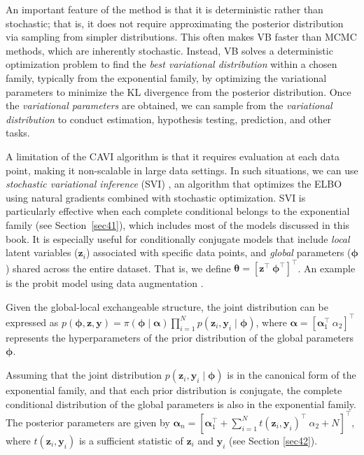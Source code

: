 An important feature of the method is that it is deterministic rather than stochastic; that is, it does not require approximating the posterior distribution via sampling from simpler distributions. This often makes VB faster than MCMC methods, which are inherently stochastic. Instead, VB solves a deterministic optimization problem to find the \textit{best variational distribution} within a chosen family, typically from the exponential family, by optimizing the variational parameters to minimize the KL divergence from the posterior distribution. Once the \textit{variational parameters} are obtained, we can sample from the \textit{variational distribution} to conduct estimation, hypothesis testing, prediction, and other tasks.

A limitation of the CAVI algorithm is that it requires evaluation at each data point, making it non-scalable in large data settings. In such situations, we can use \textit{stochastic variational inference} (SVI) \cite{hoffman2013stochastic}, an algorithm that optimizes the ELBO using natural gradients combined with stochastic optimization. SVI is particularly effective when each complete conditional belongs to the exponential family (see Section~\ref{sec41}), which includes most of the models discussed in this book. It is especially useful for conditionally conjugate models that include \textit{local} latent variables ($\boldsymbol{z}_i$) associated with specific data points, and \textit{global} parameters ($\boldsymbol{\phi}$) shared across the entire dataset. That is, we define $\boldsymbol\theta = [\boldsymbol{z}^{\top} \ \boldsymbol{\phi}^{\top}]^{\top}$. An example is the probit model using data augmentation \cite{Tanner1987}.

Given the global-local exchangeable structure, the joint distribution can be expressed as $p(\boldsymbol{\phi}, \boldsymbol{z}, \boldsymbol{y}) = \pi(\boldsymbol{\phi} \mid \boldsymbol{\alpha}) \prod_{i=1}^{N} p(\boldsymbol{z}_i, \boldsymbol{y}_i \mid \boldsymbol{\phi})$, where $\boldsymbol{\alpha} = [\boldsymbol{\alpha}_1^{\top} \ \alpha_2]^{\top}$ represents the hyperparameters of the prior distribution of the global parameters $\boldsymbol{\phi}$.

Assuming that the joint distribution $p(\boldsymbol{z}_i, \boldsymbol{y}_i \mid \boldsymbol{\phi})$ is in the canonical form of the exponential family, and that each prior distribution is conjugate, the complete conditional distribution of the global parameters is also in the exponential family. The posterior parameters are given by $\boldsymbol{\alpha}_n = [\boldsymbol{\alpha}_1^{\top} + \sum_{i=1}^N t(\boldsymbol{z}_i, \boldsymbol{y}_i)^{\top} \ \alpha_2 + N]^{\top}$, where $t(\boldsymbol{z}_i, \boldsymbol{y}_i)$ is a sufficient statistic of $\boldsymbol{z}_i$ and $\boldsymbol{y}_i$ (see Section \ref{sec42}).

